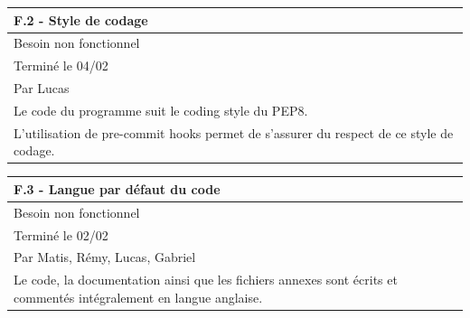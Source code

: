 \documentclass[a4paper,12pt]{article}
\begin{document}
\noindent
\setlength{\arrayrulewidth}{1.5pt}
\renewcommand{\arraystretch}{1.5}
\begin{tabularx}{\textwidth}{|X|}
    \hline
    \textbf{F.2 - Style de codage}                                                          \\
    \hline
    Besoin non fonctionnel                                                                  \\
    \hline
    Terminé le 04/02                                                                        \\
    Par Lucas                                                                               \\
    \hline
    Le code du programme suit le coding style du PEP8.                                      \\
    L’utilisation de pre-commit hooks permet de s’assurer du respect de ce style de codage. \\
    \hline
\end{tabularx}

\vspace{1cm}

\noindent
\setlength{\arrayrulewidth}{1.5pt}
\renewcommand{\arraystretch}{1.5}
\begin{tabularx}{\textwidth}{|X|}
    \hline
    \textbf{F.3 - Langue par défaut du code}                                                                            \\
    \hline
    Besoin non fonctionnel                                                                                              \\
    \hline
    Terminé le 02/02                                                                                                    \\
    Par Matis, Rémy, Lucas, Gabriel                                                                                     \\
    \hline
    Le code, la documentation ainsi que les fichiers annexes sont écrits et commentés intégralement en langue anglaise. \\
    \hline
\end{tabularx}

\vspace{1cm}
\end{document}
